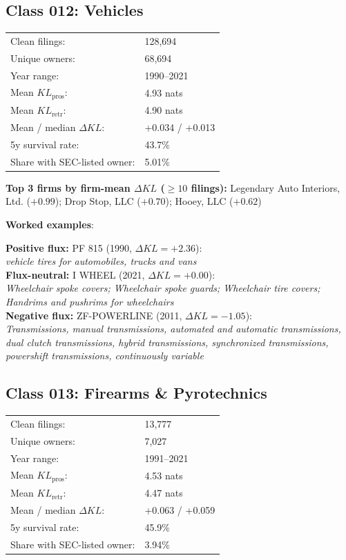 \subsection*{Class 012: Vehicles}
\label{app:industry-012}

\begin{tabular}{ll}
Clean filings: & 128,694 \\
Unique owners: & 68,694 \\
Year range: & 1990--2021 \\
Mean $KL_\text{pros}$: & 4.93 nats \\
Mean $KL_\text{retr}$: & 4.90 nats \\
Mean / median $\Delta KL$: & +0.034 / +0.013 \\
5y survival rate: & 43.7\% \\
Share with SEC-listed owner: & 5.01\% \\
\end{tabular}

\textbf{Top 3 firms by firm-mean $\Delta KL$ ($\geq 10$ filings):} Legendary Auto Interiors, Ltd. ($+0.99$); Drop Stop, LLC ($+0.70$); Hooey, LLC ($+0.62$)

\textbf{Worked examples}:

  \textbf{Positive flux:} \textsc{PF 815} (1990, $\Delta KL=+2.36$):\\
  \textit{vehicle tires for automobiles, trucks and vans}\\
  \textbf{Flux-neutral:} \textsc{I WHEEL} (2021, $\Delta KL=+0.00$):\\
  \textit{Wheelchair spoke covers; Wheelchair spoke guards; Wheelchair tire covers; Handrims and pushrims for wheelchairs}\\
  \textbf{Negative flux:} \textsc{ZF-POWERLINE} (2011, $\Delta KL=-1.05$):\\
  \textit{Transmissions, manual transmissions, automated and automatic transmissions, dual clutch transmissions, hybrid transmissions, synchronized transmissions, powershift transmissions, continuously variable}\\

\subsection*{Class 013: Firearms \& Pyrotechnics}
\label{app:industry-013}

\begin{tabular}{ll}
Clean filings: & 13,777 \\
Unique owners: & 7,027 \\
Year range: & 1991--2021 \\
Mean $KL_\text{pros}$: & 4.53 nats \\
Mean $KL_\text{retr}$: & 4.47 nats \\
Mean / median $\Delta KL$: & +0.063 / +0.059 \\
5y survival rate: & 45.9\% \\
Share with SEC-listed owner: & 3.94\% \\
\end{tabular}

